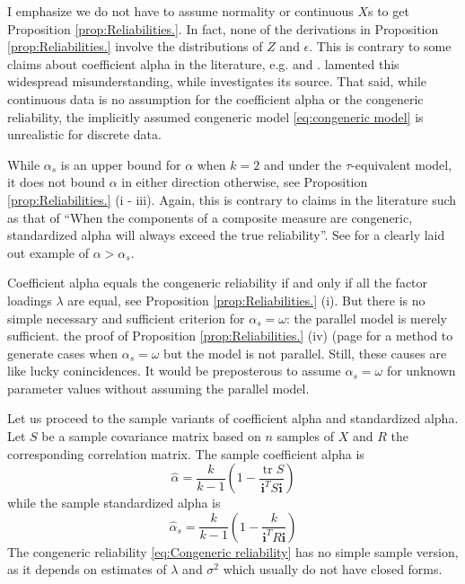 \documentclass{article}
\theoremstyle{plain}
\theoremstyle{plain}
\theoremstyle{definition}
\theoremstyle{remark}
\theoremstyle{definition}
\theoremstyle{plain}
\theoremstyle{plain}
\theoremstyle{definition}
\DeclareMathOperator{\tr}{tr}
\begin{document}
I emphasize we do not have to assume normality or continuous $X$s to get Proposition \ref{prop:Reliabilities.}. In fact, none of the derivations in Proposition \ref{prop:Reliabilities.} involve the distributions of $Z$ and $\epsilon$. This is contrary to some claims about coefficient alpha in the literature, e.g. \citep[][p.415]{McNeish2018-vu} and \citep[][p.21]{Zumbo2007-ap}. \citet{Raykov2019-yr} lamented this widespread misunderstanding, while \citet[][p. 1060]{Chalmers2018-fj} investigates its source. That said, while continuous data is no assumption for the coefficient alpha or the congeneric reliability, the implicitly assumed congeneric model \eqref{eq:congeneric model} is unrealistic for discrete data. 

While $\alpha_s$ is an upper bound for $\alpha$ when $k = 2$ and under the $\tau$-equivalent model, it does not bound $\alpha$ in either direction otherwise, see Proposition \ref{prop:Reliabilities.} (i - iii). Again, this is contrary to claims in the literature such as that of \citep[][p.348]{Osburn2000-jd} \enquote{When the components of a composite measure are congeneric, standardized alpha will always exceed the true reliability}. See \citet[][p.450]{Falk2011-ae} for a clearly laid out example of $\alpha>\alpha_s$.

Coefficient alpha equals the congeneric reliability if and only if all the factor loadings $\lambda$ are equal, see Proposition \ref{prop:Reliabilities.} (i). But there is no simple necessary and sufficient criterion for $\alpha_s = \omega$: the parallel model is merely sufficient.  the proof of Proposition \ref{prop:Reliabilities.} (iv) (page \pageref{proof:Reliabilities.} for a method to generate cases when $\alpha_s = \omega$ but the model is not parallel. Still, these causes are like lucky conincidences. It would be preposterous to assume $\alpha_s = \omega$ for unknown parameter values without assuming the parallel model.

Let us proceed to the sample variants of coefficient alpha and standardized
alpha. Let $S$ be a sample covariance matrix based on
$n$ samples of $X$ and $R$ the corresponding correlation matrix.
The sample coefficient alpha is 
\begin{equation}
\widehat{\alpha}=\frac{k}{k-1}\left(1-\frac{\tr{S}}{\mathbf{i}^{T}S\mathbf{i}}\right)\label{eq:sample coefficient alpha}
\end{equation}
while the sample standardized alpha is
\begin{equation}
\widehat{\alpha}_s=\frac{k}{k-1}\left(1-\frac{k}{\mathbf{i}^{T}R\mathbf{i}}\right)\label{eq:sample standardized alpha}
\end{equation}
The congeneric reliability \eqref{eq:Congeneric reliability} has no
simple sample version, as it depends on estimates of $\lambda$ and
$\sigma^{2}$ which usually do not have closed forms.
\end{document}
